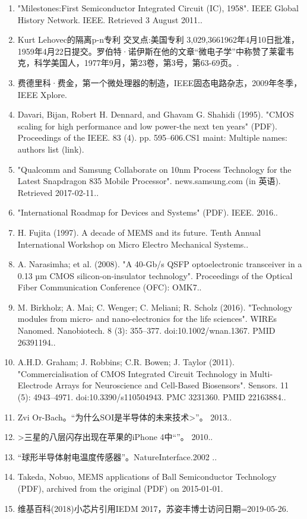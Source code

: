 \begin{enumerate}
\item "Milestones:First Semiconductor Integrated Circuit (IC), 1958". IEEE Global History Network. IEEE. Retrieved 3 August 2011..
\item Kurt Lehovec的隔离p-n专利 交叉点:美国专利 3,029,3661962年4月10日批准，1959年4月22日提交。罗伯特·诺伊斯在他的文章“微电子学”中称赞了莱霍韦克，科学美国人，1977年9月，第23卷，第3号，第63-69页。.
\item 费德里科·费金，第一个微处理器的制造，IEEE固态电路杂志，2009年冬季，IEEE Xplore.
\item Davari, Bijan, Robert H. Dennard, and Ghavam G. Shahidi (1995). "CMOS scaling for high performance and low power-the next ten years" (PDF). Proceedings of the IEEE. 83 (4). pp. 595–606.CS1 maint: Multiple names: authors list (link).
\item "Qualcomm and Samsung Collaborate on 10nm Process Technology for the Latest Snapdragon 835 Mobile Processor". news.samsung.com (in 英语). Retrieved 2017-02-11..
\item "International Roadmap for Devices and Systems" (PDF). IEEE. 2016..
\item H. Fujita (1997). A decade of MEMS and its future. Tenth Annual International Workshop on Micro Electro Mechanical Systems..
\item A. Narasimha; et al. (2008). "A 40-Gb/s QSFP optoelectronic transceiver in a 0.13 µm CMOS silicon-on-insulator technology". Proceedings of the Optical Fiber Communication Conference (OFC): OMK7..
\item M. Birkholz; A. Mai; C. Wenger; C. Meliani; R. Scholz (2016). "Technology modules from micro- and nano-electronics for the life sciences". WIREs Nanomed. Nanobiotech. 8 (3): 355–377. doi:10.1002/wnan.1367. PMID 26391194..
\item A.H.D. Graham; J. Robbins; C.R. Bowen; J. Taylor (2011). "Commercialisation of CMOS Integrated Circuit Technology in Multi-Electrode Arrays for Neuroscience and Cell-Based Biosensors". Sensors. 11 (5): 4943–4971. doi:10.3390/s110504943. PMC 3231360. PMID 22163884..
\item Zvi Or-Bach。“为什么SOI是半导体的未来技术>”。 2013..
\item >三星的八层闪存出现在苹果的iPhone 4中“”。 2010..
\item “球形半导体射电温度传感器”。NatureInterface.2002 ..
\item Takeda, Nobuo, MEMS applications of Ball Semiconductor Technology (PDF), archived from the original (PDF) on 2015-01-01.
\item 维基百科(2018)小芯片引用IEDM 2017，苏姿丰博士访问日期=2019-05-26.

\end{enumerate}
